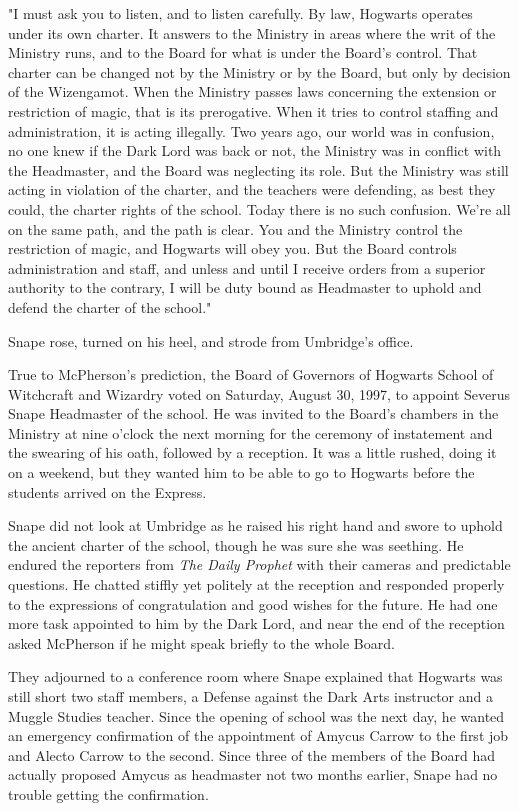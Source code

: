 "I must ask you to listen, and to listen carefully. By law, Hogwarts operates under its own charter. It answers to the Ministry in areas where the writ of the Ministry runs, and to the Board for what is under the Board's control. That charter can be changed not by the Ministry or by the Board, but only by decision of the Wizengamot. When the Ministry passes laws concerning the extension or restriction of magic, that is its prerogative. When it tries to control staffing and administration, it is acting illegally. Two years ago, our world was in confusion, no one knew if the Dark Lord was back or not, the Ministry was in conflict with the Headmaster, and the Board was neglecting its role. But the Ministry was still acting in violation of the charter, and the teachers were defending, as best they could, the charter rights of the school. Today there is no such confusion. We're all on the same path, and the path is clear. You and the Ministry control the restriction of magic, and Hogwarts will obey you. But the Board controls administration and staff, and unless and until I receive orders from a superior authority to the contrary, I will be duty bound as Headmaster to uphold and defend the charter of the school."

Snape rose, turned on his heel, and strode from Umbridge's office.

True to McPherson's prediction, the Board of Governors of Hogwarts School of Witchcraft and Wizardry voted on Saturday, August 30, 1997, to appoint Severus Snape Headmaster of the school. He was invited to the Board's chambers in the Ministry at nine o'clock the next morning for the ceremony of instatement and the swearing of his oath, followed by a reception. It was a little rushed, doing it on a weekend, but they wanted him to be able to go to Hogwarts before the students arrived on the Express.

Snape did not look at Umbridge as he raised his right hand and swore to uphold the ancient charter of the school, though he was sure she was seething. He endured the reporters from \emph{The Daily Prophet} with their cameras and predictable questions. He chatted stiffly yet politely at the reception and responded properly to the expressions of congratulation and good wishes for the future. He had one more task appointed to him by the Dark Lord, and near the end of the reception asked McPherson if he might speak briefly to the whole Board.

They adjourned to a conference room where Snape explained that Hogwarts was still short two staff members, a Defense against the Dark Arts instructor and a Muggle Studies teacher. Since the opening of school was the next day, he wanted an emergency confirmation of the appointment of Amycus Carrow to the first job and Alecto Carrow to the second. Since three of the members of the Board had actually proposed Amycus as headmaster not two months earlier, Snape had no trouble getting the confirmation.

